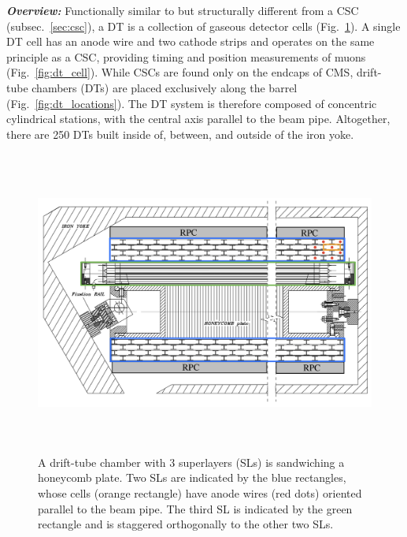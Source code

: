\textbf{\textit{Overview:}}
Functionally similar to but structurally different from a CSC (subsec.~\ref{sec:csc}), a DT is a collection of gaseous detector cells (Fig.~\ref{fig:dt_superlayers}).
A single DT cell has an anode wire and two cathode strips and operates on the same principle as a CSC, providing timing and position measurements of muons (Fig.~\ref{fig:dt_cell}).
While CSCs are found only on the endcaps of CMS, drift-tube chambers (DTs) are placed exclusively along the barrel (Fig.~\ref{fig:dt_locations}).
The DT system is therefore composed of concentric cylindrical stations, with the central axis parallel to the beam pipe.
Altogether, there are 250 DTs built inside of, between, and outside of the iron yoke.
\begin{figure}[pbth]
    \centering
    \includegraphics[width=15cm,height=10cm,keepaspectratio]{figures/cms/muonsys/drifttube_superlayers.jpeg}
        \caption{
        A drift-tube chamber with 3 superlayers (SLs) is sandwiching a honeycomb plate.
        Two SLs are indicated by the blue rectangles, whose cells (orange rectangle) have anode wires (red dots) oriented parallel to the beam pipe.
        The third SL is indicated by the green rectangle and is staggered orthogonally to the other two SLs.
        }
        \label{fig:dt_superlayers}
\end{figure}
